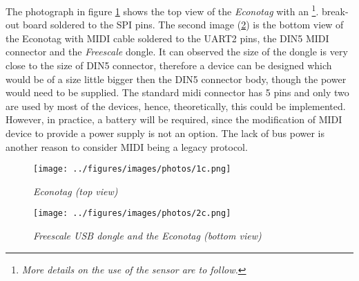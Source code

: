   The photograph in figure \ref{fig:photo:1} shows the top view
 of the \emph{Econotag} with an \footnote{\emph{%
 More details on the use of the sensor are to follow.}}.
 break-out board soldered to the SPI pins. The second image
 (\ref{fig:photo:2}) is the bottom view of the Econotag with
 MIDI cable soldered to the UART2 pins, the DIN5 MIDI connector
 and the \emph{Freescale} dongle. It can observed the size of
 the dongle is very close to the size of DIN5 connector,
 therefore a device can be designed which would be of a size
 little bigger then the DIN5 connector body, though the power
 would need to be supplied. The standard midi connector
 has 5 pins and only two are used by most of the devices,
 hence, theoretically, this could be implemented. However,
 in practice, a battery will be required, since the modification
 of MIDI device to provide a power supply is not an option.
 The lack of bus power is another reason to consider MIDI
 being a legacy protocol.

\begin{figure}
\centering
\texttt{[image: ../figures/images/photos/1c.png]}
\caption{\emph{Econotag (top view)}}\label{fig:photo:1}
\end{figure}

\begin{figure}
\centering
\texttt{[image: ../figures/images/photos/2c.png]}
\caption{\emph{Freescale USB dongle and the Econotag (bottom view)}}\label{fig:photo:2}
\end{figure}
